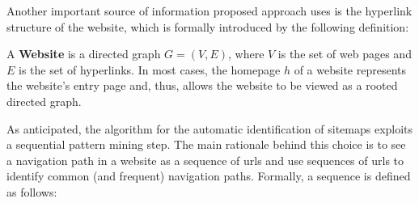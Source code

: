 \begin{figure}

\caption{}
\label{fig:Stanford}
\end{figure}


Another important source of information proposed approach uses is the hyperlink structure of the website, which is formally introduced by the following definition:


\begin{definition}\label{def:website}A \textbf{Website} is a directed graph $G = (V, E)$, where $V$ is the set of web pages and $E$ is the set of hyperlinks. In most cases, the homepage $h$ of a website represents the website's entry page and, thus, allows the website to be viewed as a rooted directed graph. 
\end{definition}



As anticipated, the algorithm for the automatic identification of sitemaps exploits a sequential pattern mining step. The main  rationale behind this choice is to see a navigation path in a website as a sequence of urls and use sequences of urls to identify common (and frequent) navigation paths. Formally, a sequence is defined as follows:


